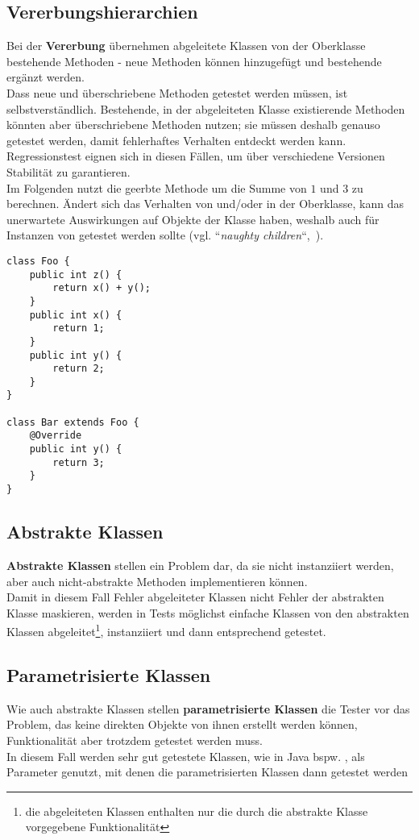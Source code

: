\subsection*{Vererbungshierarchien}
Bei der \textbf{Vererbung} übernehmen abgeleitete Klassen von der Oberklasse bestehende Methoden - neue Methoden können hinzugefügt und bestehende ergänzt werden.\\
Dass neue und überschriebene Methoden getestet werden müssen, ist selbstverständlich.
Bestehende, in der abgeleiteten Klasse existierende Methoden könnten aber überschriebene Methoden nutzen; sie müssen deshalb genauso getestet werden, damit fehlerhaftes Verhalten entdeckt werden kann.
Regressionstest eignen sich in diesen Fällen, um über verschiedene Versionen Stabilität zu garantieren.\\
Im Folgenden nutzt  die geerbte Methode  um die Summe von $1$ und $3$ zu berechnen.
Ändert sich das Verhalten von  und/oder in der Oberklasse, kann das unerwartete Auswirkungen auf Objekte der Klasse  haben, weshalb auch  für  Instanzen von  getestet werden sollte (vgl. ``\textit{naughty children}``,~\cite[Table 17.2, 843]{Bin99}).

\begin{verbatim}
class Foo {
    public int z() {
        return x() + y();
    }
    public int x() {
        return 1;
    }
    public int y() {
        return 2;
    }
}

class Bar extends Foo {
    @Override
    public int y() {
        return 3;
    }
}
\end{verbatim}


\subsection*{Abstrakte Klassen}
\textbf{Abstrakte Klassen} stellen ein Problem dar, da sie nicht instanziiert werden, aber auch nicht-abstrakte Methoden implementieren können.\\
Damit in diesem Fall Fehler abgeleiteter Klassen nicht Fehler der abstrakten Klasse maskieren, werden in Tests möglichst einfache Klassen von den abstrakten Klassen abgeleitet\footnote{
    die abgeleiteten Klassen enthalten nur die durch die abstrakte Klasse vorgegebene Funktionalität
}, instanziiert und dann entsprechend getestet.

\subsection*{Parametrisierte Klassen}
Wie auch abstrakte Klassen stellen \textbf{parametrisierte Klassen} die Tester vor das Problem, das keine direkten Objekte von ihnen erstellt werden können, Funktionalität aber trotzdem getestet werden muss.\\
In diesem Fall werden sehr gut getestete Klassen, wie in Java bspw. , als Parameter genutzt, mit denen die parametrisierten Klassen dann getestet werden